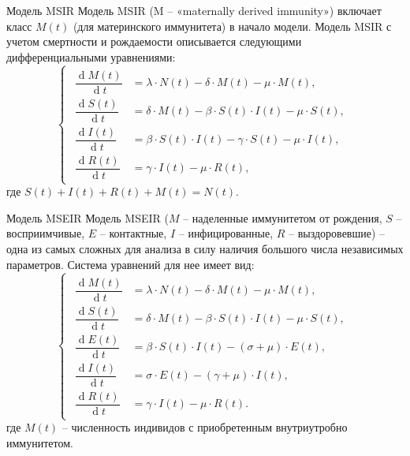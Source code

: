 \documentclass[notheorems]{beamer}
\renewcommand{\d}{\operatorname{d}}
\begin{document}

\begin{frame}{Модель MSIR}
		Модель MSIR (M -- «maternally derived immunity») включает класс $M(t)$ (для материнского иммунитета) в начало модели. Модель MSIR с учетом смертности и рождаемости описывается следующими дифференциальными уравнениями:
	\begin{equation}
		\left\{ 
		\begin{gathered} 
			\begin{aligned}
				\dfrac {\d M(t)}{\d t} &= \lambda\cdot N(t) - \delta\cdot M(t)-\mu\cdot M(t),\\
				\dfrac {\d S(t)}{\d t} &= \delta \cdot M(t) -\beta\cdot S(t)\cdot I(t) - \mu \cdot S(t),\\
				\dfrac{\d I(t)}{\d t} &=\beta\cdot S(t)\cdot I(t) - \gamma \cdot S(t) - \mu \cdot I(t),\\
				\dfrac{\d R(t)}{\d t} &= \gamma\cdot I(t) - \mu \cdot R(t), 
			\end{aligned}
		\end{gathered} 
		\right.
	\end{equation}
	где $S(t) + I(t) + R(t) + M(t) = N(t).$
\end{frame}


\begin{frame}
	{Модель MSEIR}
	Модель MSEIR ($M$ -- наделенные иммунитетом от рождения, $S$ -- восприимчивые, $E$ -- контактные, $I$ -- инфицированные, $R$ -- выздоровевшие) -- одна из самых сложных для анализа в силу наличия большого числа независимых параметров. Система уравнений для нее имеет вид:
	\begin{equation}
		\left\{ 
		\begin{gathered} 
			\begin{aligned}
				\dfrac {\d M(t)}{\d t} &= \lambda\cdot N(t) - \delta\cdot M(t)-\mu\cdot M(t),\\
				\dfrac {\d S(t)}{\d t} &= \delta \cdot M(t) -\beta\cdot S(t)\cdot I(t) - \mu \cdot S(t),\\
				\dfrac {\d E(t)}{\d t} &= \beta \cdot S(t)\cdot I(t) - (\sigma + \mu)\cdot E(t),\\
				\dfrac{\d I(t)}{\d t} &=\sigma \cdot E(t) - (\gamma + \mu)\cdot I(t),\\
				\dfrac{\d R(t)}{\d t} &= \gamma\cdot I(t) - \mu \cdot R(t). 
			\end{aligned}
		\end{gathered} 
		\right.
	\end{equation}
	где $M (t)$ -- численность индивидов с приобретенным внутриутробно иммунитетом.
\end{frame}
\end{document}
